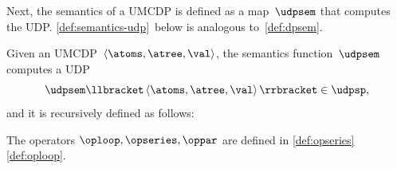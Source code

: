 Next, the semantics of a UMCDP is defined as a map~$\udpsem$ that
computes the UDP. \cref{def:semantics-udp}~below is analogous
to~\cref{def:dpsem}.
\begin{definition}
\label{def:semantics-udp}Given an UMCDP~$\left\langle \atoms,\atree,\val\right\rangle $,
the semantics function~$\udpsem$ computes a UDP
\[
\udpsem\llbracket\left\langle \atoms,\atree,\val\right\rangle \rrbracket\in\udpsp,
\]
and it is recursively defined as follows:

\adjustbox{max width=8.6cm}{
\noindent\begin{minipage}[t]{1\columnwidth}
\[
\udpsem\llbracket\left\langle \atoms,a,\val\right\rangle \rrbracket=\val(a),\qquad\text{for all}\ a\in\atoms.
\]
\begin{align*}
\udpL\udpsem\llbracket\left\langle \atoms,\dpseries(\atree_{1},\atree_{2}),\val\right\rangle \rrbracket & =(\udpL\udpsem\llbracket\left\langle \atoms,\atree_{1},\val\right\rangle \rrbracket)\,\opseries\,(\udpL\udpsem\llbracket\left\langle \atoms,\atree_{2},\val\right\rangle \rrbracket),\\
\udpU\udpsem\llbracket\left\langle \atoms,\dpseries(\atree_{1},\atree_{2}),\val\right\rangle \rrbracket & =(\udpU\udpsem\llbracket\left\langle \atoms,\atree_{1},\val\right\rangle \rrbracket)\,\opseries\,(\udpU\udpsem\llbracket\left\langle \atoms,\atree_{2},\val\right\rangle \rrbracket),
\end{align*}
\begin{align*}
\udpL\udpsem\llbracket\left\langle \atoms,\dppar(\atree_{1},\atree_{2}),\val\right\rangle ] & =(\udpL\udpsem\llbracket\left\langle \atoms,\atree_{1},\val\right\rangle \rrbracket)\ \oppar\ (\udpL\udpsem\llbracket\left\langle \atoms,\atree_{2},\val\right\rangle \rrbracket),\\
\udpU\udpsem\llbracket\left\langle \atoms,\dppar(\atree_{1},\atree_{2}),\val\right\rangle ] & =(\udpU\udpsem\llbracket\left\langle \atoms,\atree_{1},\val\right\rangle \rrbracket)\ \oppar\ (\udpU\udpsem\llbracket\left\langle \atoms,\atree_{2},\val\right\rangle \rrbracket),
\end{align*}
\begin{align*}
\udpL\udpsem\llbracket\left\langle \atoms,\dploop(\atree),\val\right\rangle \rrbracket & =(\udpL\udpsem\llbracket\left\langle \atoms,\atree,\val\right\rangle \rrbracket)^{\oploop},\\
\udpU\udpsem\llbracket\left\langle \atoms,\dploop(\atree),\val\right\rangle \rrbracket & =(\udpU\udpsem\llbracket\left\langle \atoms,\atree,\val\right\rangle \rrbracket)^{\oploop}.
\end{align*}

\end{minipage}}
\end{definition}
The operators $\oploop,\opseries,\oppar$ are defined in \cref{def:opseries}\textendash \cref{def:oploop}.

